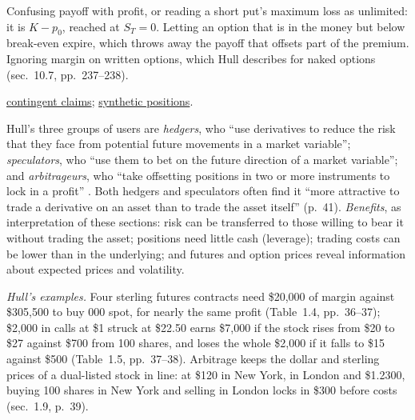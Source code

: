 \begin{qfmethod}
 Confusing payoff with profit, or reading a short put's maximum loss as unlimited: it is $K-p_0$, reached at $S_T=0$. Letting an option that is in the money but below break-even expire, which throws away the payoff that offsets part of the premium. Ignoring margin on written options, which Hull describes for naked options (sec.~10.7, pp.~237--238).

 \hyperref[def:derivative-types-commitments-contingent]{contingent claims}; \hyperref[res:synthetic-short-put-call]{synthetic positions}.

\end{qfmethod}

\begin{qfdefinition}\label{def:derivative-uses-risks}
 Hull's three groups of users are \emph{hedgers}, who ``use derivatives to reduce the risk that they face from potential future movements in a market variable''; \emph{speculators}, who ``use them to bet on the future direction of a market variable''; and \emph{arbitrageurs}, who ``take offsetting positions in two or more instruments to lock in a profit'' \citep[chap.~1, sec.~1.6, p.~33]{s7-hulloptions}. Both hedgers and speculators often find it ``more attractive to trade a derivative on an asset than to trade the asset itself'' (p.~41). \emph{Benefits}, as interpretation of these sections: risk can be transferred to those willing to bear it without trading the asset; positions need little cash (leverage); trading costs can be lower than in the underlying; and futures and option prices reveal information about expected prices and volatility.

 \emph{Hull's examples.} Four sterling futures contracts need \$20{,}000 of margin against \$305{,}500 to buy 000 spot, for nearly the same profit (Table~1.4, pp.~36--37); \$2{,}000 in calls at \$1 struck at \$22.50 earns \$7{,}000 if the stock rises from \$20 to \$27 against \$700 from 100 shares, and loses the whole \$2{,}000 if it falls to \$15 against \$500 (Table~1.5, pp.~37--38). Arbitrage keeps the dollar and sterling prices of a dual-listed stock in line: at \$120 in New York,  in London and \$1.2300, buying 100 shares in New York and selling in London locks in \$300 before costs (sec.~1.9, p.~39).


\end{qfdefinition}
